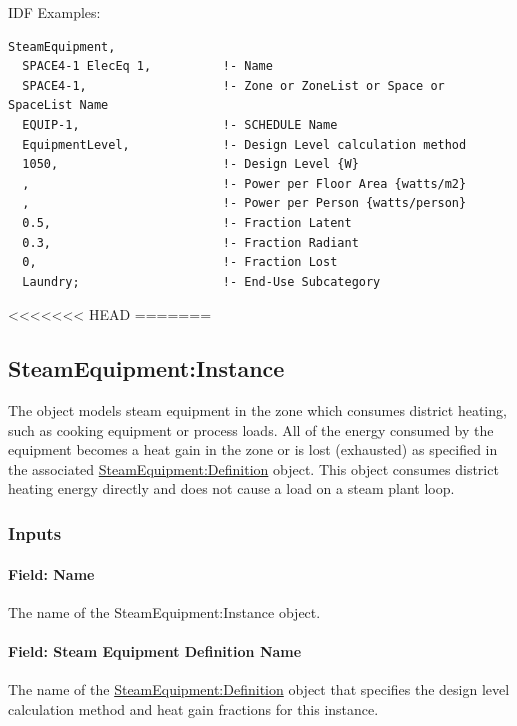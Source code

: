IDF Examples:

\begin{lstlisting}
SteamEquipment,
  SPACE4-1 ElecEq 1,          !- Name
  SPACE4-1,                   !- Zone or ZoneList or Space or SpaceList Name
  EQUIP-1,                    !- SCHEDULE Name
  EquipmentLevel,             !- Design Level calculation method
  1050,                       !- Design Level {W}
  ,                           !- Power per Floor Area {watts/m2}
  ,                           !- Power per Person {watts/person}
  0.5,                        !- Fraction Latent
  0.3,                        !- Fraction Radiant
  0,                          !- Fraction Lost
  Laundry;                    !- End-Use Subcategory
\end{lstlisting}

<<<<<<< HEAD
=======

\subsection{SteamEquipment:Instance}\label{steamequipmentinstance}

The object models steam equipment in the zone which consumes district heating, such as cooking equipment or process loads. All of the energy consumed by the equipment becomes a heat gain in the zone or is lost (exhausted) as specified in the associated \hyperref[steamequipmentdefinition]{SteamEquipment:Definition} object. This object consumes district heating energy directly and does not cause a load on a steam plant loop.

\subsubsection{Inputs}\label{inputs-6-012-steam-instance}

\paragraph{Field: Name}\label{field-name-6-009-steam-instance}

The name of the SteamEquipment:Instance object.

\paragraph{Field: Steam Equipment Definition Name}\label{field-steam-equipment-definition-name}

The name of the \hyperref[steamequipmentdefinition]{SteamEquipment:Definition} object that specifies the design level calculation method and heat gain fractions for this instance.


